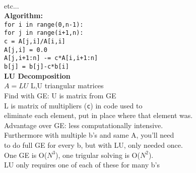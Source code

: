 \documentclass[10pt]{article}
\newcommand\tab[1][0.5cm]{\hspace*{#1}}
\begin{document}
{	\\ etc...
	\\\textbf{Algorithm:} 
	\\\texttt{for i in range(0,n-1):} 
	\\\tab \texttt{for j in range(i+1,n):}
	\\\tab\tab \texttt{c = A[j,i]/A[i,i]}
	\\\tab\tab \texttt{A[j,i] = 0.0}
	\\\tab\tab \texttt{A[j,i+1:n] -= c*A[i,i+1:n]}
	\\\tab\tab \texttt{b[j] = b[j]-c*b[i]}
	\\\textbf{LU Decomposition}
	\\$A=LU$ L,U triangular matrices
	\\Find with GE: U is matrix from GE
	\\L is matrix of multipliers (\texttt{c}) in code used to
	\\eliminate each element, put in place where that element was.
	\\Advantage over GE: less computationally intensive.
	\\Furthermore with multiple b's and same A, you'll need 	
	\\to do full GE for every b, but with LU, only needed once.
	\\One GE is O($N^3$), one trigular solving is O($N^2$).
	\\LU only requires one of each of these for many b's
}
\end{document}

